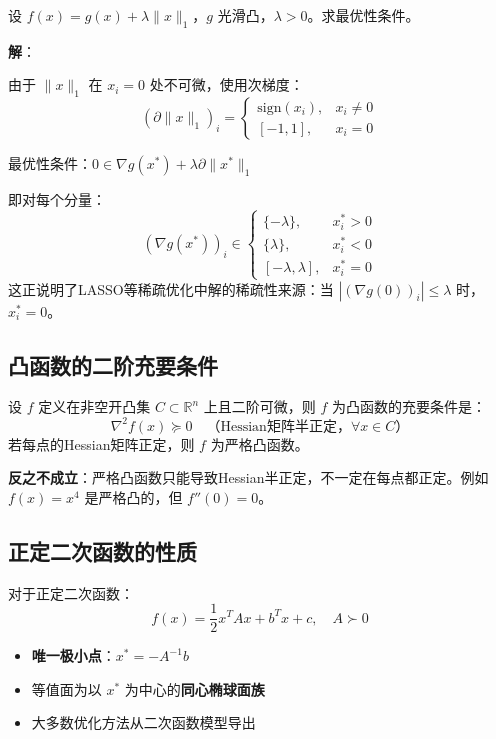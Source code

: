 \begin{example}[复合优化问题的一阶条件]
设 $f(x) = g(x) + \lambda \|x\|_1$，$g$ 光滑凸，$\lambda > 0$。求最优性条件。

\textbf{解}：

由于 $\|x\|_1$ 在 $x_i = 0$ 处不可微，使用次梯度：
\[
(\partial \|x\|_1)_i = \begin{cases}
\text{sign}(x_i), & x_i \neq 0 \\[-4pt]
[-1, 1], & x_i = 0
\end{cases}
\]

最优性条件：$0 \in \nabla g(x^*) + \lambda \partial \|x^*\|_1$

即对每个分量：
\[
(\nabla g(x^*))_i \in \begin{cases}
\{-\lambda\}, & x_i^* > 0 \\
\{\lambda\}, & x_i^* < 0 \\
[-\lambda, \lambda], & x_i^* = 0
\end{cases}
\]
这正说明了LASSO等稀疏优化中解的稀疏性来源：当 $|(\nabla g(0))_i| \leq \lambda$ 时，$x_i^* = 0$。
\end{example}

\subsection{凸函数的二阶充要条件}

\begin{theorem}[凸函数的二阶充要条件]\label{thm:convex-second-order}
设 $f$ 定义在非空开凸集 $C \subset \mathbb{R}^n$ 上且二阶可微，则 $f$ 为凸函数的充要条件是：
\[
\nabla^2 f(x) \succeq 0 \quad \text{（Hessian矩阵半正定，$\forall x \in C$）}
\]
若每点的Hessian矩阵正定，则 $f$ 为严格凸函数。
\end{theorem}

\begin{notebox}[重要区别]
\textbf{反之不成立}：严格凸函数只能导致Hessian半正定，不一定在每点都正定。例如 $f(x) = x^4$ 是严格凸的，但 $f''(0) = 0$。
\end{notebox}

\subsection{正定二次函数的性质}

对于正定二次函数：
\[
f(x) = \frac{1}{2}x^T A x + b^T x + c,\quad A \succ 0
\]

\begin{property}[二次函数的极值]
\begin{itemize}[itemsep=0.3em]
    \item \textbf{唯一极小点}：$x^* = -A^{-1}b$
    \item 等值面为以 $x^*$ 为中心的\textbf{同心椭球面族}
    \item 大多数优化方法从二次函数模型导出
\end{itemize}
\end{property}

